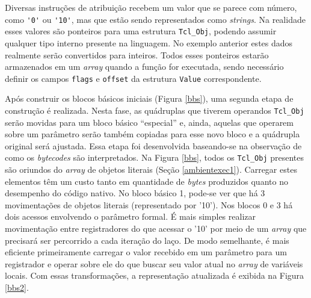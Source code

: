 Diversas instruções de atribuição recebem um
valor que se parece com número, como \verb!'0'! ou \verb!'10'!, mas
que estão sendo representados como \textit{strings}. Na realidade esses valores
são ponteiros para uma estrutura \verb!Tcl_Obj!, podendo assumir
qualquer tipo interno presente na linguagem. No exemplo anterior estes
dados realmente serão convertidos para inteiros. %
Todos esses ponteiros
estarão armazenados em um \textit{array} quando a função for executada,
sendo necessário definir os campos \verb!flags! e \verb!offset! da
estrutura \verb!Value! correspondente.

Após construir os blocos básicos iniciais (Figura \ref{bbs}), uma
segunda etapa de construção é realizada. Nesta fase, as quádruplas que
tiverem operandos \verb!Tcl_Obj! serão
movidas para um bloco básico ``especial'' e, ainda, aquelas que
operarem sobre um parâmetro serão também copiadas para esse novo bloco
e a quádrupla original será ajustada. Essa etapa foi desenvolvida
baseando-se na observação de como os
\textit{bytecodes} são interpretados. Na Figura \ref{bbs}, todos
os \verb!Tcl_Obj! presentes são oriundos do \textit{array} de objetos
literais (Seção \ref{ambientexec1}). Carregar estes elementos têm um
custo tanto em quantidade de \textit{bytes} produzidos quanto no
desempenho do código nativo. No bloco básico 1, pode-se ver que há 3
movimentações de objetos literais (representado por '10'). Nos blocos 0 e 3
há dois acessos envolvendo o parâmetro formal. É mais simples
realizar movimentação entre registradores do que acessar o '10'
por meio de um \textit{array} que precisará ser percorrido a cada
iteração do laço. De modo semelhante, é mais eficiente primeiramente
carregar o valor recebido em um parâmetro para um registrador e operar
sobre ele do que buscar
seu valor atual no \textit{array} de variáveis locais. Com essas
transformações, a representação atualizada é exibida na Figura \ref{bbs2}.

